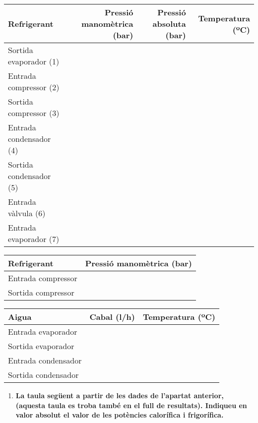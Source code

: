 \documentclass[a4paper]{article}
\begin{document}
\begin{table}[H]
	\centering
	\begin{tabular}{l|rrr}
		Refrigerant & Pressió manomètrica (bar) & Pressió absoluta (bar) & Temperatura (ºC) \\
		\hline
		Sortida evaporador (1) & & & \\
		Entrada compressor (2) & & & \\
		Sortida compressor (3) & & & \\
		Entrada condensador (4) & & & \\
		Sortida condensador (5) & & & \\
		Entrada vàlvula (6) & & & \\
		Entrada evaporador (7) & & & \\
	\end{tabular}
\end{table}

\begin{table}[H]
	\centering
	\begin{tabular}{l|r}
		Refrigerant & Pressió manomètrica (bar) \\
		\hline
		Entrada compressor & \\
		Sortida compressor & \\
	\end{tabular}
\end{table}

\begin{table}[H]
	\centering
	\begin{tabular}{l|rr}
		Aigua & Cabal (l/h) & Temperatura (ºC) \\
		\hline
		Entrada evaporador & & \\
		Sortida evaporador & & \\
		Entrada condensador & & \\
		Sortida condensador & & \\
	\end{tabular}
\end{table}

\begin{enumerate}[resume]
	\item \textbf{La taula següent a partir de les dades de l'apartat anterior, (aquesta taula es troba també en el full de resultats). Indiqueu en valor absolut el valor de les potències calorífica i frigorífica.}
\end{enumerate}
\end{document}
